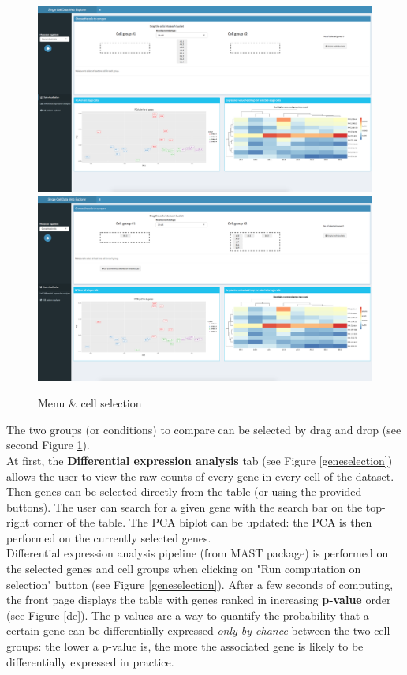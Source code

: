 \documentclass{report}
\begin{document}
{\begin{figure}[H]
\centering
\subfigure\includegraphics[scale=0.2]{application/menu.png}
\subfigure\includegraphics[scale=0.2]{application/cellselection.png}
\caption{Menu \& cell selection}
\label{menu}
\end{figure}

The two groups (or conditions) to compare can be selected by drag and drop (see second Figure \ref{menu}).\\

At first, the \textbf{Differential expression analysis} tab (see Figure \ref{geneselection}) allows the user to view the raw counts of every gene in every cell of the dataset. Then genes can be selected directly from the table (or using the provided buttons). The user can search for a given gene with the search bar on the top-right corner of the table. The PCA biplot can be updated: the PCA is then performed on the currently selected genes.\\

Differential expression analysis pipeline (from MAST package\cite{finak2015mast}) is performed on the selected genes and cell groups when clicking on "Run computation on selection" button (see Figure \ref{geneselection}). After a few seconds of computing, the front page displays the table with genes ranked in increasing \textbf{p-value} order (see Figure \ref{de}). The p-values are a way to quantify the probability that a certain gene can be differentially expressed \textit{only by chance} between the two cell groups: the lower a p-value is, the more the associated gene is likely to be differentially expressed in practice.\\

}
\end{document}
